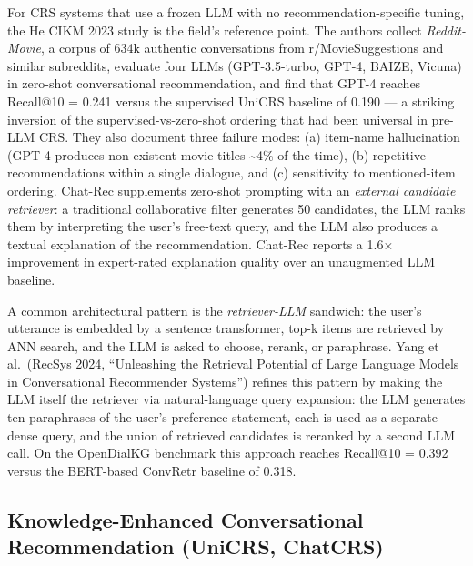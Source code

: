 \documentclass{article}
\begin{document}
For CRS systems that use a frozen LLM with no recommendation-specific tuning, the He CIKM 2023 study is the field's reference point. The authors collect \emph{Reddit-Movie}, a corpus of 634k authentic conversations from r/MovieSuggestions and similar subreddits, evaluate four LLMs (GPT-3.5-turbo, GPT-4, BAIZE, Vicuna) in zero-shot conversational recommendation, and find that GPT-4 reaches Recall@10 = 0.241 versus the supervised UniCRS baseline of 0.190 --- a striking inversion of the supervised-vs-zero-shot ordering that had been universal in pre-LLM CRS. They also document three failure modes: (a) item-name hallucination (GPT-4 produces non-existent movie titles \textasciitilde4\% of the time), (b) repetitive recommendations within a single dialogue, and (c) sensitivity to mentioned-item ordering. Chat-Rec \citep{gao2023chatrectowardsinte} supplements zero-shot prompting with an \emph{external candidate retriever}: a traditional collaborative filter generates 50 candidates, the LLM ranks them by interpreting the user's free-text query, and the LLM also produces a textual explanation of the recommendation. Chat-Rec reports a 1.6× improvement in expert-rated explanation quality over an unaugmented LLM baseline.

A common architectural pattern is the \emph{retriever-LLM} sandwich: the user's utterance is embedded by a sentence transformer, top-k items are retrieved by ANN search, and the LLM is asked to choose, rerank, or paraphrase. Yang et al.~(RecSys 2024, ``Unleashing the Retrieval Potential of Large Language Models in Conversational Recommender Systems'') refines this pattern by making the LLM itself the retriever via natural-language query expansion: the LLM generates ten paraphrases of the user's preference statement, each is used as a separate dense query, and the union of retrieved candidates is reranked by a second LLM call. On the OpenDialKG benchmark this approach reaches Recall@10 = 0.392 versus the BERT-based ConvRetr baseline of 0.318.

\subsection{Knowledge-Enhanced Conversational Recommendation (UniCRS, ChatCRS)}\label{knowledge-enhanced-conversational-recommendation-unicrs-chatcrs}
\end{document}
